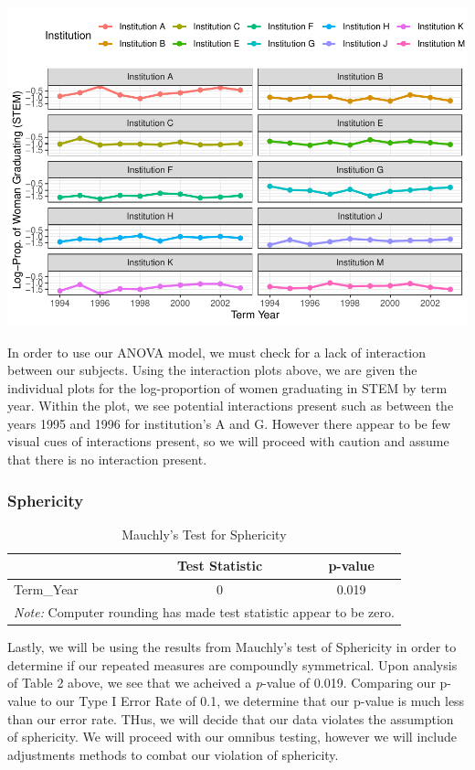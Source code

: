 \documentclass[]{article}
\begin{document}
\includegraphics{Stat_461_Final_Project_Report_files/figure-latex/logInteraction-1.pdf}

In order to use our ANOVA model, we must check for a lack of interaction
between our subjects. Using the interaction plots above, we are given
the individual plots for the log-proportion of women graduating in STEM
by term year. Within the plot, we see potential interactions present
such as between the years 1995 and 1996 for institution's A and G.
However there appear to be few visual cues of interactions present, so
we will proceed with caution and assume that there is no interaction
present.

\subsubsection{Sphericity}\label{sphericity}

\begin{table}[H]

\caption{\label{tab:Sphericity}Mauchly's Test for Sphericity}
\centering
\fontsize{12}{14}\selectfont
\begin{tabular}[t]{l|c|c}
\hline
  & Test Statistic & p-value\\
\hline
Term\_Year & 0 & 0.019\\
\hline
\multicolumn{3}{l}{\textit{Note: } Computer rounding has made test statistic appear to be zero.}\\
\end{tabular}
\end{table}

Lastly, we will be using the results from Mauchly's test of Sphericity
in order to determine if our repeated measures are compoundly
symmetrical. Upon analysis of Table 2 above, we see that we acheived a
\emph{p}-value of 0.019. Comparing our p-value to our Type I Error Rate
of 0.1, we determine that our p-value is much less than our error rate.
THus, we will decide that our data violates the assumption of
sphericity. We will proceed with our omnibus testing, however we will
include adjustments methods to combat our violation of sphericity.
\end{document}
